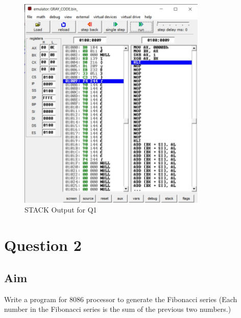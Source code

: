 \documentclass{article}
\begin{document}
\begin{figure}[h]
\begin{center}
\includegraphics[width=0.8\textwidth]{GRAY_OUT} 
\caption{STACK Output for Q1}
\end{center}
\end{figure}



\break
\section{Question 2}

\subsection{Aim}
Write a program for 8086 processor to generate the Fibonacci series (Each number in the Fibonacci series is the sum of the previous two numbers.)
\end{document}

